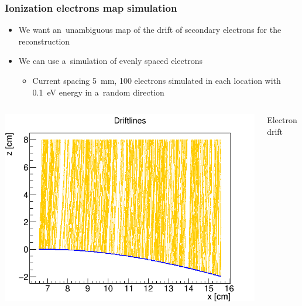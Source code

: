 \documentclass{beamer}
\begin{document}
	\begin{frame}
		\frametitle{Ionization electrons map simulation}
		\begin{itemize}
			\item We want an~unambiguous map of the drift of secondary electrons for the reconstruction
			\item We can use a~simulation of evenly spaced electrons
			\begin{itemize}
				\item Current spacing 5~mm, 100 electrons simulated in each location with 0.1~eV energy in a~random direction
			\end{itemize}
		\end{itemize}
		\begin{columns}
				\centering
				\begin{minipage}[t][4.2cm]{\textwidth}
					\centering
					\includegraphics[width = \textwidth]{../images/drift_xz.png}\\
				\end{minipage}
				{Electron drift}
				\centering
				\begin{minipage}[t][4.2cm]{\textwidth}
					\centering

\end{minipage}
\end{columns}
\end{frame}
\end{document}
